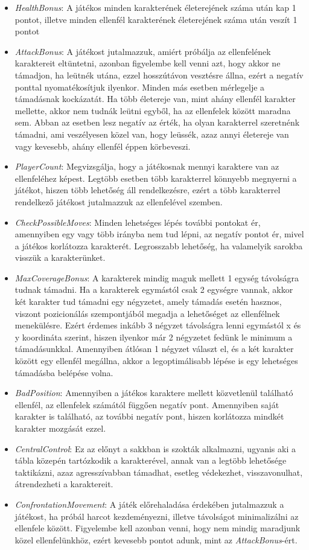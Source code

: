 \documentclass[
]{thesis-ekf}
\theoremstyle{definition}
\theoremstyle{remark}
\begin{document}
\begin{itemize}
	\item \emph{HealthBonus}: A játékos minden karakterének életerejének száma után kap 1 pontot, illetve minden ellenfél karakterének életerejének száma után veszít 1 pontot
	\item \emph{AttackBonus}: A játékost jutalmazzuk, amiért próbálja az ellenfelének karaktereit eltüntetni, azonban figyelembe kell venni azt, hogy akkor ne támadjon, ha leütnék utána, ezzel hosszútávon vesztésre állna, ezért a negatív ponttal nyomatékosítjuk ilyenkor. Minden más esetben mérlegelje a támadásnak kockázatát. Ha több életereje van, mint ahány ellenfél karakter mellette, akkor nem tudnák leütni egyből, ha az ellenfelek között maradna sem. Abban az esetben lesz negatív az érték, ha olyan karakterrel szeretnénk támadni, ami veszélyesen közel van, hogy leüssék, azaz annyi életereje van vagy kevesebb, ahány ellenfél éppen körbeveszi.
	\item \emph{PlayerCount}: Megvizsgálja, hogy a játékosnak mennyi karaktere van az ellenfeléhez képest. Legtöbb esetben több karakterrel könnyebb megnyerni a játékot, hiszen több lehetőség áll rendelkezésre, ezért a több karakterrel rendelkező játékost jutalmazzuk az ellenfelével szemben.
	\item \emph{CheckPossibleMoves}: Minden lehetséges lépés további pontokat ér, amennyiben egy vagy több irányba nem tud lépni, az negatív pontot ér, mivel a játékos korlátozza karakterét. Legrosszabb lehetőség, ha valamelyik sarokba visszük a karakterünket.
	\item \emph{MaxCoverageBonus}: A karakterek mindig maguk mellett 1 egység távolságra tudnak támadni. Ha a karakterek egymástól csak 2 egységre vannak, akkor két karakter tud támadni egy négyzetet, amely támadás esetén hasznos, viszont pozicionálás szempontjából megadja a lehetőséget az ellenfélnek menekülésre. Ezért érdemes inkább 3 négyzet távolságra lenni egymástól x és y koordináta szerint, hiszen ilyenkor már 2 négyzetet fedünk le minimum a támadásunkkal. Amennyiben átlósan 1 négyzet választ el, és a két karakter között egy ellenfél megállna, akkor a legoptimálisabb lépése is egy lehetséges támadásba belépése volna.
	\item \emph{BadPosition}: Amennyiben a játékos karaktere mellett közvetlenül található ellenfél, az ellenfelek számától függően negatív pont. Amennyiben saját karakter is található, az további negatív pont, hiszen korlátozza mindkét karakter mozgását ezzel.
	\item \emph{CentralControl}: Ez az előnyt a sakkban is szokták alkalmazni, ugyanis aki a tábla közepén tartózkodik a karakterével, annak van a legtöbb lehetősége taktikázni, azaz agresszívabban támadhat, esetleg védekezhet, visszavonulhat, átrendezheti a karaktereit.
	\item \emph{ConfrontationMovement}: A játék előrehaladása érdekében jutalmazzuk a játékost, ha próbál harcot kezdeményezni, illetve távolságot minimalizálni az ellenfele között. Figyelembe kell azonban venni, hogy nem mindig maradjunk közel ellenfelünkhöz, ezért kevesebb pontot adunk, mint az \emph{AttackBonus}-ért.
\end{itemize}
\end{document}
